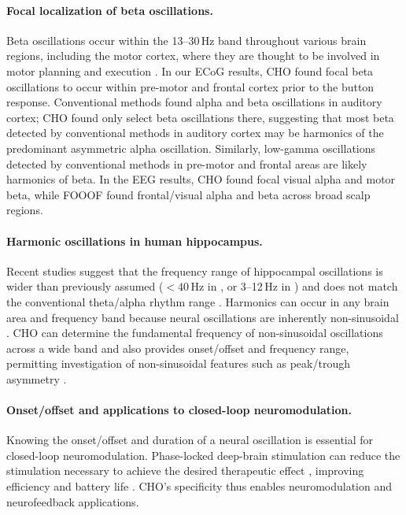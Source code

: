\documentclass[11pt]{article}
\begin{document}
\paragraph{Focal localization of beta oscillations.}
Beta oscillations occur within the 13--30\,Hz band throughout various brain regions, including the motor cortex, where they are thought to be involved in motor planning and execution \citep{pfurtscheller1999,jenkinson2011,doyle2005,senkowski2006}. In our ECoG results, CHO found focal beta oscillations to occur within pre-motor and frontal cortex prior to the button response. Conventional methods found alpha and beta oscillations in auditory cortex; CHO found only select beta oscillations there, suggesting that most beta detected by conventional methods in auditory cortex may be harmonics of the predominant asymmetric alpha oscillation. Similarly, low-gamma oscillations detected by conventional methods in pre-motor and frontal areas are likely harmonics of beta. In the EEG results, CHO found focal visual alpha and motor beta, while FOOOF found frontal/visual alpha and beta across broad scalp regions.

\paragraph{Harmonic oscillations in human hippocampus.}
Recent studies suggest that the frequency range of hippocampal oscillations is wider than previously assumed ($<40$\,Hz in \citealp{cole2019}, or 3--12\,Hz in \citealp{li2022}) and does not match the conventional theta/alpha rhythm range \citep{buzsaki2006}. Harmonics can occur in any brain area and frequency band because neural oscillations are inherently non-sinusoidal \citep{davis2020}. CHO can determine the fundamental frequency of non-sinusoidal oscillations across a wide band and also provides onset/offset and frequency range, permitting investigation of non-sinusoidal features such as peak/trough asymmetry \citep{cole2019}.

\paragraph{Onset/offset and applications to closed-loop neuromodulation.}
Knowing the onset/offset and duration of a neural oscillation is essential for closed-loop neuromodulation. Phase-locked deep-brain stimulation can reduce the stimulation necessary to achieve the desired therapeutic effect \citep{cagnan2017,cagnan2019}, improving efficiency and battery life \citep{chen2011,zanos2018,shirinpour2020}. CHO's specificity thus enables neuromodulation and neurofeedback applications.
\end{document}
